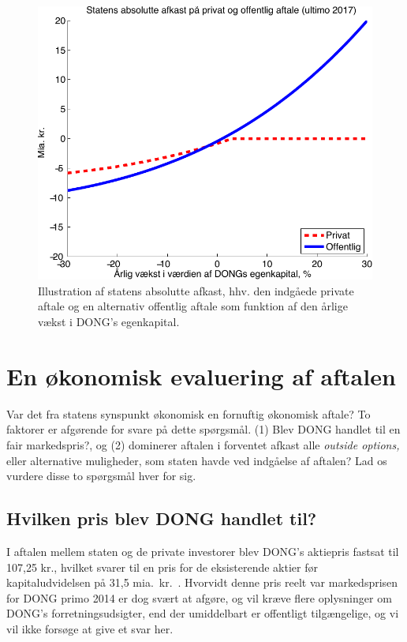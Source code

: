 \documentclass{article}
\begin{document}
\begin{figure}
\centerline{\includegraphics[scale=0.8]{../matlab/figs/private_public_deal_guan}}
\caption{Illustration af statens absolutte afkast, hhv. den indg\aa{}ede private aftale og en alternativ offentlig aftale som funktion af den \aa{}rlige v\ae{}kst i DONG's egenkapital. }
\label{fig:privat_off}
\end{figure}


\section{En økonomisk evaluering af aftalen}

Var det fra statens synspunkt økonomisk en fornuftig økonomisk aftale? To faktorer er afgørende for svare på dette spørgsmål. (1) Blev DONG handlet til en fair markedspris?, og (2) dominerer aftalen i forventet afkast  alle \emph{outside options,} eller alternative muligheder, som staten havde ved indgåelse af aftalen? Lad os vurdere disse to spørgsmål hver for sig.

\subsection{Hvilken pris blev DONG handlet til?}

I aftalen mellem staten og de private investorer blev  DONG's aktiepris fastsat til 107,25 kr., hvilket svarer til en pris for de eksisterende aktier før kapitaludvidelsen på 31,5 mia.\ kr.\ \citep{FM2013a}. Hvorvidt denne pris reelt var markedsprisen for DONG primo 2014 er dog svært at afgøre, og vil kræve flere oplysninger om DONG's forretningsudsigter, end der umiddelbart er offentligt tilgængelige, og vi vil ikke forsøge at give et svar her. 
\end{document}
